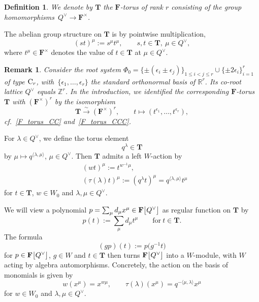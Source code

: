 \documentclass[11pt]{article}
\numberwithin{equation}{section}
\numberwithin{equation}{section}
\newtheorem{Definition}[Theorem]{Definition}
\newtheorem{Remark}[Theorem]{Remark} }
\begin{document}
\begin{Definition}\label{T_def}
We denote by $\mathbf{T}$ the $\mathbf{F}$-torus of rank $r$ consisting of the group homomorphisms~$Q^\vee\rightarrow\mathbf{F}^\times$.
\end{Definition}
The abelian group structure on $\mathbf{T}$ is by pointwise multiplication,
\[ (st)^\mu:=s^\mu t^\mu,\qquad s,t\in\mathbf{T},\ \mu\in Q^\vee,
\]
where $t^\mu\in\mathbf{F}^\times$ denotes the value of $t\in\mathbf{T}$ at $\mu\in Q^\vee$.
\begin{Remark}
Consider the root system $\Phi_0=\{\pm(\epsilon_i\pm\epsilon_j)\}_{1\leq i<j\leq r}\cup\{\pm 2\epsilon_i\}_{i=1}^r$ of type ${\rm C}_r$, with~$\{\epsilon_1,\dots,\epsilon_r\}$ the standard orthonormal basis of $\mathbb{R}^r$. Its co-root lattice $Q^\vee$
equals $\mathbb{Z}^r$. In the introduction, we identified the corresponding $\mathbf{F}$-torus $\mathbf{T}$ with $(\mathbf{F}^\times)^r$ by the isomorphism
\[
\mathbf{T}\overset{\sim}{\longrightarrow}(\mathbf{F}^\times)^r,\qquad t\mapsto (t^{\epsilon_1},\dots,t^{\epsilon_r}),
\]
cf.~\eqref{F_torus_CC} and~\eqref{F_torus_CCC}.
\end{Remark}


For $\lambda\in Q^\vee$, we define the torus element
\[
q^\lambda\in\mathbf{T}
\]
by $\mu\mapsto q^{\langle \lambda,\mu\rangle}$, $\mu\in Q^\vee$. Then $\mathbf{T}$ admits a left $W$-action by
\begin{align}
&(wt)^\mu:=t^{w^{-1}\mu},\nonumber\\
&(\tau(\lambda)t)^\mu:=(q^\lambda t)^\mu=q^{\langle\lambda,\mu\rangle}t^\mu\label{Waction}
\end{align}
for $t\in\mathbf{T}$, $w\in W_0$ and $\lambda,\mu\in Q^\vee$.

We will view a polynomial $p=\sum_\mu d_\mu x^\mu\in\mathbf{F}\smash{\bigl[Q^\vee\bigr]}$ as regular function on $\mathbf{T}$ by
\[
p(t):=\sum_\mu d_\mu t^\mu\qquad \text{for}\ t\in\mathbf{T}.
\]
The formula
\[
(gp)(t):=p\bigl(g^{-1}t\bigr)
\]
for $p\in\mathbf{F}\smash{\bigl[Q^\vee\bigr]}$, $g\in W$ and $t\in\mathbf{T}$ then turns $\mathbf{F}\smash{\bigl[Q^\vee\bigr]}$ into a $W$-module, with $W$ acting by algebra automorphisms.
Concretely, the action on the basis of monomials is given by
\begin{equation}\label{Wa}
w(x^\mu)=x^{w\mu},\qquad
\tau(\lambda)(x^\mu)=q^{-\langle\mu,\lambda\rangle}x^\mu
\end{equation}
for $w\in W_0$ and $\lambda,\mu\in Q^\vee$.
\end{document}
